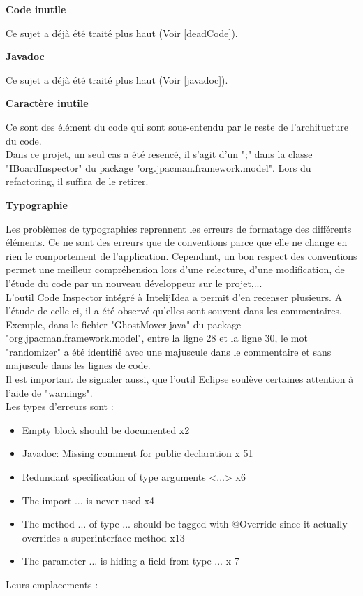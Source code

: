 \documentclass[12pt,a4paper,final]{article}
\newcommand{\smalltitle}[1]{\bigskip\large\textbf{#1}\par\normalsize\medskip}
\begin{document}
\smalltitle{Code inutile}
Ce sujet a déjà été traité plus haut (Voir \ref{deadCode}).


\smalltitle{Javadoc}
Ce sujet a déjà été traité plus haut (Voir \ref{javadoc}).


\smalltitle{Caractère inutile}
Ce sont des élément du code qui sont sous-entendu par le reste de l'architucture du code.\\
Dans ce projet, un seul cas a été resencé, il s'agit d'un ";" dans la classe "IBoardInspector" du package "org.jpacman.framework.model". Lors du refactoring, il suffira de le retirer.


\smalltitle{Typographie}
Les problèmes de typographies reprennent les erreurs de formatage des différents éléments. Ce ne sont des erreurs que de conventions parce que elle ne change en rien le comportement de l'application. Cependant, un bon respect des conventions permet une meilleur compréhension lors d'une relecture, d'une modification, de l'étude du code par un nouveau développeur sur le projet,...\\
L'outil Code Inspector intégré à IntelijIdea a permit d'en recenser plusieurs. A l'étude de celle-ci, il a été observé qu'elles sont souvent dans les commentaires. Exemple, dans le fichier "GhostMover.java" du package "org.jpacman.framework.model", entre la ligne 28 et la ligne 30, le mot "randomizer" a été identifié avec une majuscule dans le commentaire et sans majuscule dans les lignes de code.\\
\vspace{3cm}
Il est important de signaler aussi, que l'outil Eclipse soulève certaines attention à l'aide de "warnings".\\
Les types d'erreurs sont : 
\begin{itemize}
\item Empty block should be documented x2
\item Javadoc: Missing comment for public declaration x 51
\item Redundant specification of type arguments <...> x6
\item The import ... is never used x4
\item The method ... of type ... should be tagged with @Override since it actually overrides a superinterface method x13
\item The parameter ... is hiding a field from type ... x 7
\end {itemize}
Leurs emplacements : \\
\end{document}
